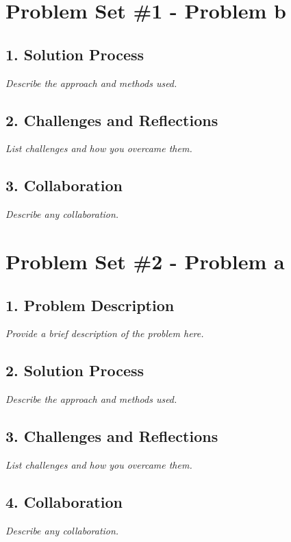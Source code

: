 \documentclass[a4paper,12pt]{article}
\begin{document}
\newpage

\section*{Problem Set \#1 - Problem b}

\subsection*{1. Solution Process}
\textit{Describe the approach and methods used.}

\subsection*{2. Challenges and Reflections}
\textit{List challenges and how you overcame them.}

\subsection*{3. Collaboration}
\textit{Describe any collaboration.}

\newpage

\section*{Problem Set \#2 - Problem a}
\subsection*{1. Problem Description}
\textit{Provide a brief description of the problem here.}

\subsection*{2. Solution Process}
\textit{Describe the approach and methods used.}

\subsection*{3. Challenges and Reflections}
\textit{List challenges and how you overcame them.}

\subsection*{4. Collaboration}
\textit{Describe any collaboration.}

\end{document}

